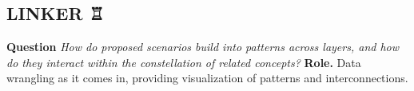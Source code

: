 \subsection*{LINKER {\chess ♖}{\hfill \cognitive}}

\textbf{Question}
\emph{How do proposed scenarios build into patterns across layers, and how do they interact within the constellation of related concepts?}\newline
\textbf{Role.} Data wrangling as it comes in, providing visualization of patterns and interconnections.
